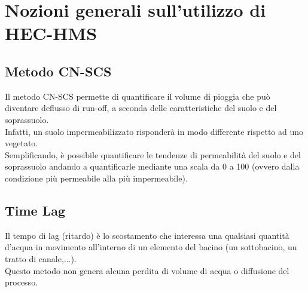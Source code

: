 \section{Nozioni generali sull'utilizzo di HEC-HMS}
\subsection{Metodo CN-SCS}
Il metodo CN-SCS permette di quantificare il volume di pioggia che può diventare deflusso di run-off, a seconda delle caratteristiche del suolo e del soprassuolo.\\
Infatti, un suolo impermeabilizzato risponderà in modo differente rispetto ad uno vegetato.\\
Semplificando, è possibile quantificare le tendenze di permeabilità del suolo e del soprassuolo andando a quantificarle mediante una scala da 0 a 100 (ovvero dalla condizione più permeabile alla più impermeabile).
\subsection{Time Lag}
Il tempo di lag (ritardo) è lo scostamento che interessa una qualsiasi quantità d'acqua in movimento all'interno di un elemento del bacino (un sottobacino, un tratto di canale,...).\\
Questo metodo non genera alcuna perdita di volume di acqua o diffusione del processo. 